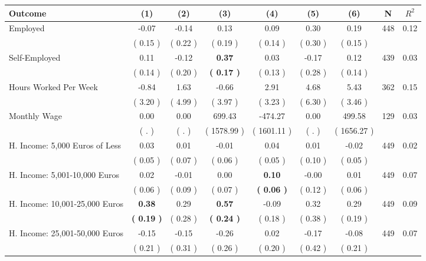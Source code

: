 \begin{tabular}{lcccccccc}
\toprule
 \textbf{Outcome} & \textbf{(1)} & \textbf{(2)} & \textbf{(3)} & \textbf{(4)} & \textbf{(5)} & \textbf{(6)} & \textbf{N} & \textbf{$ R^2$} \\
\midrule
Employed &     -0.07 &     -0.14 &      0.13 &      0.09 &      0.30 &      0.19 & 448 &       0.12 \\ 
 & (     0.15 ) & (     0.22 ) & (     0.19 ) & (     0.14 ) & (     0.30 ) & (     0.15 ) & \\
Self-Employed &      0.11 &     -0.12 & \textbf{     0.37} &      0.03 &     -0.17 &      0.12 & 439 &       0.03 \\ 
 & (     0.14 ) & (     0.20 ) & \textbf{(     0.17 )} & (     0.13 ) & (     0.28 ) & (     0.14 ) & \\
Hours Worked Per Week &     -0.84 &      1.63 &     -0.66 &      2.91 &      4.68 &      5.43 & 362 &       0.15 \\ 
 & (     3.20 ) & (     4.99 ) & (     3.97 ) & (     3.23 ) & (     6.30 ) & (     3.46 ) & \\
Monthly Wage &      0.00 &      0.00 &    699.43 &   -474.27 &      0.00 &    499.58 & 129 &       0.03 \\ 
 & (        . ) & (        . ) & (  1578.99 ) & (  1601.11 ) & (        . ) & (  1656.27 ) & \\
H. Income: 5,000 Euros of Less &      0.03 &      0.01 &     -0.01 &      0.04 &      0.01 &     -0.02 & 449 &       0.02 \\ 
 & (     0.05 ) & (     0.07 ) & (     0.06 ) & (     0.05 ) & (     0.10 ) & (     0.05 ) & \\
H. Income: 5,001-10,000 Euros &      0.02 &     -0.01 &      0.00 & \textbf{     0.10} &     -0.00 &      0.01 & 449 &       0.07 \\ 
 & (     0.06 ) & (     0.09 ) & (     0.07 ) & \textbf{(     0.06 )} & (     0.12 ) & (     0.06 ) & \\
H. Income: 10,001-25,000 Euros & \textbf{     0.38} &      0.29 & \textbf{     0.57} &     -0.09 &      0.32 &      0.29 & 449 &       0.09 \\ 
 & \textbf{(     0.19 )} & (     0.28 ) & \textbf{(     0.24 )} & (     0.18 ) & (     0.38 ) & (     0.19 ) & \\
H. Income: 25,001-50,000 Euros &     -0.15 &     -0.15 &     -0.26 &      0.02 &     -0.17 &     -0.08 & 449 &       0.07 \\ 
 & (     0.21 ) & (     0.31 ) & (     0.26 ) & (     0.20 ) & (     0.42 ) & (     0.21 ) & \\

\end{tabular}
